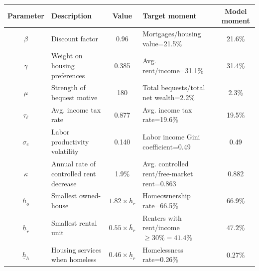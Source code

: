 \footnotesize
\renewcommand{\arraystretch}{1.2}
\begin{center}
\begin{tabular}{clclc}\toprule
\textbf{Parameter} & \textbf{Description} & \textbf{Value} & \textbf{Target moment} & \textbf{Model moment} \\
\midrule
$\beta$ & Discount factor & 0.96 & Mortgages/housing value=21.5\% & 21.6\% \\
$\gamma$ & Weight on housing preferences & 0.385 & Avg. rent/income=31.1\% & 31.4\% \\
$\mu$ & Strength of bequest motive & 180 & Total bequests/total net wealth=2.2\% & 2.3\% \\
$\tau_{\ell}$ & Avg. income tax rate & 0.877 & Avg. income tax rate=19.6\% & 19.5\% \\
$\sigma_{e}$ & Labor productivity volatility & 0.140 & Labor income Gini coefficient=0.49 & 0.49 \\
$\kappa$ & Annual rate of controlled rent decrease & 1.9\% & Avg. controlled rent/free-market rent=0.863 & 0.882 \\
$\underline{h}_{o}$ & Smallest owned-house & $1.82 \times \overline{h}_{r}$ & Homeownership rate=66.5\% & 66.9\% \\
$\underline{h}_{r}$ & Smallest rental unit & $0.55 \times \overline{h}_{r}$ & Renters with rent/income$\geq 30\%=41.4\%$ & $47.2\%$ \\ 
$\underline{h}_{h}$ & Housing services when homeless & $0.46 \times \underline{h}_{r}$ & Homelessness rate=0.26\% & 0.27\% \\
\bottomrule
\end{tabular}
\end{center}
\normalsize

